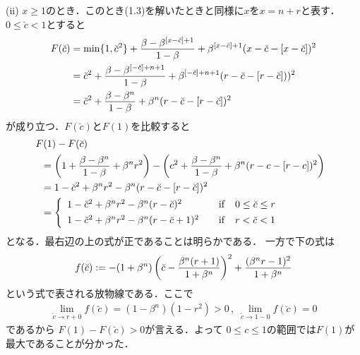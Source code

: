 \documentclass[a4paper,11pt]{jsarticle}
\DeclareRobustCommand{\lfrac}[2]{{\lower.4ex\hbox{\begingroup\ensuremath{#1}\endgroup}\over{\hspace{.2mm}#2\hspace{.2mm}}}}
\begin{document}
\noindent (ii) $x\geq 1$のとき．このとき(1.3)を解いたときと同様に$x$を$x=n+r$と表す． $0\leq \breve{c}<1$とすると
\begin{align*}
	F(\breve{c})&=\min\{1,\breve{c}^2\}+\lfrac{\beta-\beta^{[x-\breve{c}]+1}}{1-\beta}+\beta^{[x-\breve{c}]+1}(x-\breve{c}-[x-\breve{c}])^2\\
	&=\breve{c}^2+\lfrac{\beta-\beta^{[-\breve{c}]+n+1}}{1-\beta}+\beta^{[-\breve{c}]+n+1}(r-\breve{c}-[r-\breve{c}]))^2\\
	&=\breve{c}^2+\lfrac{\beta-\beta^{n}}{1-\beta}+\beta^{n}(r-\breve{c}-[r-\breve{c}])^2
\end{align*}
が成り立つ．$F(\breve{c})$と$F(1)$を比較すると
\begin{align*}
	&\hspace*{-2mm}F(1)-F(\breve{c})\\
&=\left( 1+\lfrac{\beta-\beta^{n}}{1-\beta}+\beta^{n}r^2
		\right)-\left(c^2+\lfrac{\beta-\beta^{n}}{1-\beta}+\beta^{n}(r-c-[r-c])^2\right)\\
			&=1-\breve{c}^2+\beta^{n}r^2-\beta^{n}(r-\breve{c}-[r-\breve{c}])^2\\	
			&=\left\{
				\begin{array}{ll}
				1-\breve{c}^2+\beta^nr^2-\beta^n(r-\breve{c})^2 \quad &\mathrm{if}\quad 0\leq \breve{c}\leq r \vspace{1.4mm}\\
				1-\breve{c}^2+\beta^nr^2-\beta^n(r-\breve{c}+1)^2 \quad &\mathrm{if}\quad r<\breve{c}< 1
				\end{array}
			\right.
\end{align*}
となる．最右辺の上の式が正であることは明らかである．
一方で下の式は
\begin{align*}
	f(\breve{c}):=-(1+\beta^n)\left( \breve{c}-\lfrac{\beta^n(r+1)}{1+\beta^n}\right)^2+
				\lfrac{(\beta^nr-1)^2}{1+\beta^n}
\end{align*}
という式で表される放物線である．ここで
\begin{align*}
\lim_{\breve{c} \to r+0}f(\breve{c})= (1-\beta^n)(1-r^2)>0\,,\;\lim_{\breve{c} \to 1-0}f(\breve{c})=0
\end{align*}
であるから
$F(1)-F(\breve{c})>0$が言える．よって
$0\leq c\leq 1$の範囲では$F(1)$が最大であることが分かった．
\end{document}
